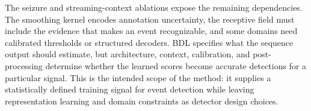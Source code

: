 The seizure and streaming-context ablations expose the remaining dependencies.
The smoothing kernel encodes annotation uncertainty, the receptive field must
include the evidence that makes an event recognizable, and some domains need
calibrated thresholds or structured decoders.
BDL specifies what the sequence output should estimate, but architecture,
context, calibration, and post-processing determine whether the learned scores
become accurate detections for a particular signal.
This is the intended scope of the method: it supplies a statistically defined
training signal for event detection while leaving representation learning and
domain constraints as detector design choices.
